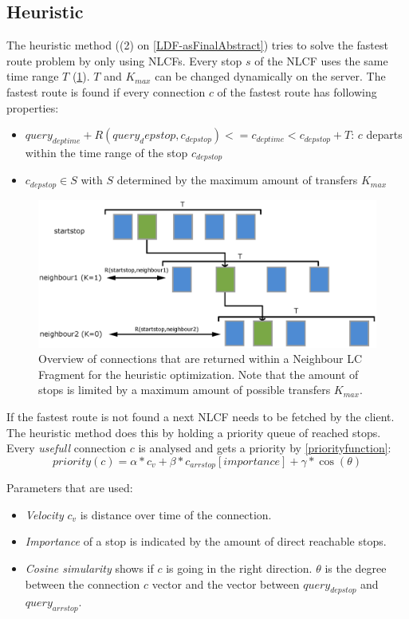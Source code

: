 \documentclass[twocolumn]{phdsymp} %
\begin{document}
\subsection{Heuristic}
\label{heuristic}

The heuristic method ((2) on \cref{LDF-asFinalAbstract}) tries to solve the fastest route problem by only using NLCFs. Every stop $s$ of the NLCF uses the same time range $T$ (\cref{neighbourconnections}). $T$ and $K_{max}$ can be changed dynamically on the server. The fastest route is found if every connection $c$ of the fastest route has following properties:
\begin{itemize}
\item $query_{deptime} + R(query_depstop, c_{depstop}) <= c_{deptime} < c_{depstop} + T$: $c$ departs within the time range of the stop $c_{depstop}$
\item $c_{depstop} \in S$ with $S$ determined by the maximum amount of transfers $K_{max}$
\end{itemize}

\begin{figure}[ht]
\begin{center}
	\includegraphics[width=.40\textwidth]{Burenconnecties}
	\caption{\label{neighbourconnections}Overview of connections that are returned within a Neighbour LC Fragment for the heuristic optimization. Note that the amount of stops is limited by a maximum amount of possible transfers $K_{max}$.}
\end{center}
\end{figure}

If the fastest route is not found a next NLCF needs to be fetched by the client. The heuristic method does this by holding a priority queue of reached stops. Every \textit{usefull} connection $c$ is analysed and gets a priority by \cref{priorityfunction}:
\begin{equation} \label{priorityfunction}
priority(c) = \alpha * c_{v} + \beta * c_{arrstop}[importance] + \gamma * \cos(\theta)
\end{equation}

Parameters that are used:
\begin{itemize}
\item \textit{Velocity} $c_{v}$ is distance over time of the connection.
\item \textit{Importance} of a stop is indicated by the amount of direct reachable stops.
\item \textit{Cosine simularity} shows if $c$ is going in the right direction. $\theta$ is the degree between the connection $c$ vector and the vector between $query_{depstop}$ and $query_{arrstop}$.
\end{itemize}
\end{document}

